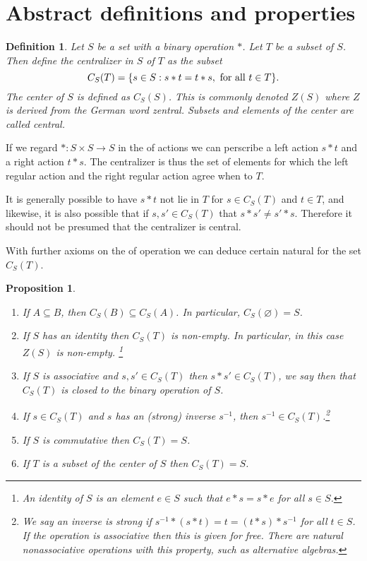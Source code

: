 \documentclass[12pt]{article}
\newtheorem{prop}[thm]{Proposition}
\newtheorem{defn}[thm]{Definition}
\begin{document}
\section{Abstract definitions and properties}

\begin{defn}
Let $S$ be a set with a binary operation $*$.  Let $T$ be a subset of $S$.  Then define 
the \emph{centralizer} in $S$ of $T$ as the subset
\begin{equation*}
   C_S(T)=\{ s\in S : s*t=t*s, \textnormal{ for all } t\in T\}.
\end{equation*}
The \emph{center} of $S$ is defined as $C_S(S)$.  This is commonly denoted $Z(S)$ where $Z$ is derived from the German word \emph{zentral}.  Subsets and elements of the center 
are called \emph{central}.
\end{defn}

If we regard $*:S\times S\to S$ in the  of actions we can perscribe a left
action $s*t$ and a right action $t*s$.  The centralizer is thus the set of elements
for which the left regular action and the right regular action agree when 
to $T$.  

It is generally possible to have $s*t$ not lie in $T$ for $s\in C_S(T)$ and
$t\in T$, and likewise, it is also possible that if $s,s'\in C_S(T)$ that $s*s'\neq s'*s$.
Therefore it should not be presumed that the centralizer is central.

With further axioms on the  of operation we can deduce certain natural 
for the set $C_S(T)$.

\begin{prop}
\begin{enumerate}
\item If $A\subseteq B$, then $C_S(B)\subseteq C_S(A)$.  In particular, $C_S(\varnothing)=S$.  
\item If $S$ has an identity then $C_S(T)$ is non-empty.  In particular, in this case $Z(S)$ is non-empty. \footnote{An identity of $S$ is an element $e\in S$ such that $e*s=s*e$ for all $s\in S$.}
\item If $S$ is associative and $s,s'\in C_S(T)$ then $s*s'\in C_S(T)$,
we say then that $C_S(T)$ is closed to the binary operation of $S$.
\item If $s\in C_S(T)$ and $s$ has an (strong) inverse $s^{-1}$, then
$s^{-1}\in C_S(T)$.\footnote{We say an inverse is strong if $s^{-1}*(s*t)=t=(t*s)*s^{-1}$ for
all $t\in S$.  If the operation is associative then this is given for free.  There
are natural nonassociative operations with this property, such as alternative algebras.}
\item If $S$ is commutative then $C_S(T)=S$.
\item If $T$ is a subset of the center of $S$ then $C_S(T)=S$.
\end{enumerate}
\end{prop}
\end{document}
